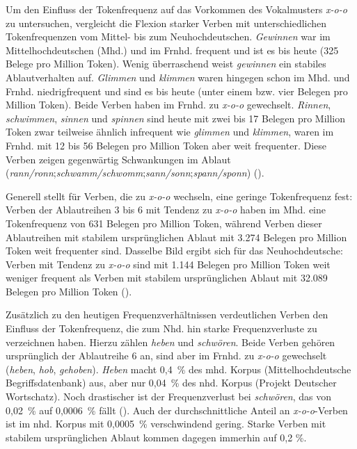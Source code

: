 Um den Einfluss der Tokenfrequenz auf das Vorkommen des Vokalmusters \textit{x-o-o} zu untersuchen, vergleicht \textcite[176--178]{Nowak.2013} die Flexion starker Verben mit unterschiedlichen Tokenfrequenzen vom Mittel- bis zum Neuhochdeutschen. \textit{Gewinnen} war im Mittelhochdeutschen (Mhd.) und im Frnhd. frequent und ist es bis heute (325 Belege pro Million Token). Wenig überraschend weist \textit{gewinnen} ein stabiles Ablautverhalten auf. \textit{Glimmen} und \textit{klimmen} waren hingegen schon im Mhd. und Frnhd. niedrigfrequent und sind es bis heute (unter einem bzw. vier Belegen pro Million Token). Beide Verben haben im Frnhd. zu \textit{x-o-o} gewechselt.  \textit{Rinnen}, \textit{schwimmen}, \textit{sinnen} und \textit{spinnen} sind heute mit zwei bis 17 Belegen pro Million Token zwar teilweise ähnlich infrequent wie \textit{glimmen} und \textit{klimmen}, waren im Frnhd. mit 12 bis 56 Belegen pro Million Token aber weit frequenter. Diese Verben zeigen gegenwärtig Schwankungen im Ablaut (\textit{rann/ronn};\textit{schwamm/schwomm};\textit{sann/sonn};\textit{spann/sponn}) (\cite[176--178]{Nowak.2013}). 



Generell stellt \textcite[138]{Nowak.2016} für Verben, die zu \textit{x-o-o} wechseln, eine geringe Tokenfrequenz fest: Verben der Ablautreihen 3 bis 6 mit Tendenz zu \textit{x-o-o} haben im Mhd. eine Tokenfrequenz von 631 Belegen pro Million Token, während Verben dieser Ablautreihen mit stabilem ursprünglichen Ablaut mit 3.274 Belegen pro Million Token weit frequenter sind. Dasselbe Bild ergibt sich für das Neuhochdeutsche: Verben mit Tendenz zu \textit{x-o-o} sind mit 1.144 Belegen pro Million Token weit weniger frequent als Verben mit stabilem ursprünglichen Ablaut mit 32.089 Belegen pro Million Token (\cite[138]{Nowak.2016}).

 

Zusätzlich zu den heutigen Frequenzverhältnissen verdeutlichen Verben den Einfluss der Tokenfrequenz, die zum Nhd. hin starke Frequenzverluste zu verzeichnen haben. Hierzu zählen \textit{heben} und \textit{schwören}. Beide Verben gehören ursprünglich der Ablautreihe 6 an, sind aber im Frnhd. zu \textit{x-o-o} gewechselt (\textit{heben}, \textit{hob}, \textit{gehoben}). \textit{Heben} macht 0,4~\% des mhd. Korpus (Mittelhochdeutsche Begriffsdatenbank) aus, aber nur 0,04~\% des nhd. Korpus (Projekt Deutscher Wortschatz). Noch drastischer ist der Frequenzverlust bei \textit{schwören}, das von 0,02~\% auf 0,0006~\% fällt (\cite[139--140]{Nowak.2016}). Auch der durchschnittliche Anteil an \textit{x-o-o}-Verben  ist im nhd. Korpus mit 0,0005~\% verschwindend gering. Starke Verben mit stabilem ursprünglichen Ablaut kommen dagegen immerhin auf 0,2 \%. 

